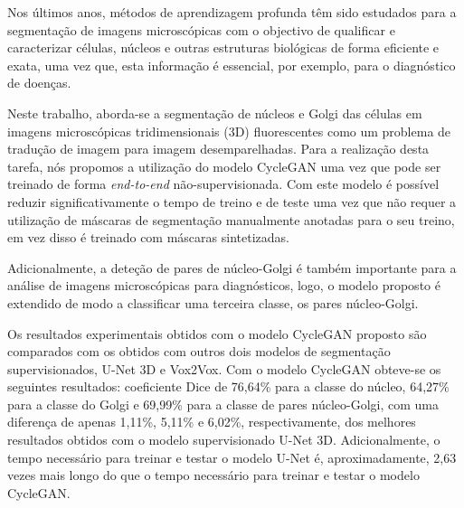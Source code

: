 \acresetall
\noindent Nos últimos anos, métodos de aprendizagem profunda têm sido estudados para a segmentação de imagens microscópicas com o objectivo de qualificar e caracterizar células, núcleos e outras estruturas biológicas de forma eficiente e exata, uma vez que, esta informação é essencial, por exemplo, para o diagnóstico de doenças.

Neste trabalho, aborda-se a segmentação de núcleos e Golgi das células em imagens microscópicas tridimensionais (3D) fluorescentes como um problema de tradução de imagem para imagem desemparelhadas. Para a realização desta tarefa, nós propomos a utilização do modelo CycleGAN uma vez que pode ser treinado de forma \textit{end-to-end} não-supervisionada. Com este modelo é possível reduzir significativamente o tempo de treino e de teste uma vez que não requer a utilização de máscaras de segmentação manualmente anotadas para o seu treino, em vez disso é treinado com máscaras sintetizadas.

Adicionalmente, a deteção de pares de núcleo-Golgi é também importante para a análise de imagens microscópicas para diagnósticos, logo, o modelo proposto é extendido de modo a classificar uma terceira classe, os pares núcleo-Golgi.

Os resultados experimentais obtidos com o modelo CycleGAN proposto são comparados com os obtidos com outros dois modelos de segmentação supervisionados, U-Net 3D e Vox2Vox. Com o modelo CycleGAN obteve-se os seguintes resultados: coeficiente Dice de 76,64\% para a classe do núcleo, 64,27\% para a classe do Golgi e 69,99\% para a classe de pares núcleo-Golgi, com uma diferença de apenas 1,11\%, 5,11\% e 6,02\%, respectivamente, dos melhores resultados obtidos com o modelo supervisionado U-Net 3D. Adicionalmente, o tempo necessário para treinar e testar o modelo U-Net é, aproximadamente, 2,63 vezes mais longo do que o tempo necessário para treinar e testar o modelo CycleGAN.



